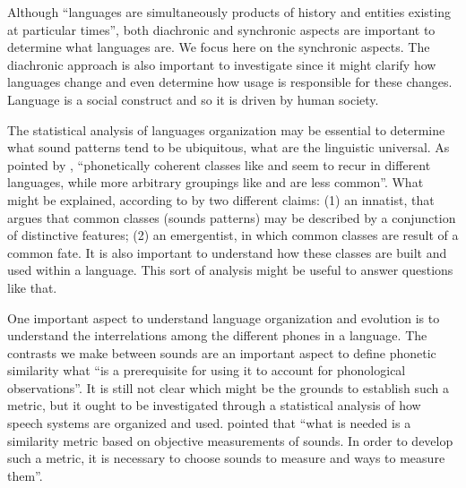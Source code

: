 
Although ``languages are simultaneously products of history and entities existing at particular times''\citep{good2008},
both diachronic and synchronic aspects are important to determine what languages are. We focus here on the
synchronic aspects. %
The diachronic approach is also important to investigate since it might clarify 
how languages change and even determine how usage is responsible for these changes. 
Language is a social construct and so it is driven by human society.

The statistical analysis of languages organization may be essential to determine what sound patterns tend to be 
ubiquitous, what are the linguistic universal.
As pointed by \cite{mielke2005}, ``phonetically coherent classes like  and  
seem to recur in different languages, while more arbitrary groupings like  and 
 are less common''. What might be explained, according to \cite{mielke2005} 
by two different claims: (1) an innatist, that argues that common classes (sounds patterns) may be described 
by a conjunction of distinctive features; (2) an emergentist, in which common classes are result of a 
common fate. It is also important to understand how these classes are built and used within a language. 
This sort of analysis might be useful to answer questions like that.

One important aspect to understand language organization and evolution is to understand the 
interrelations among the different phones in a language.
The contrasts we make between sounds are an important aspect to define phonetic similarity what 
``is a prerequisite for using it to account for phonological observations''\citep{mielke2005}. 
It is still not clear which might be the grounds to establish such a metric, but it ought to be investigated 
through a statistical analysis of how speech systems are organized and used. 
\cite{mielke2005} pointed that ``what is needed is a similarity metric based on objective measurements of sounds. 
In order to develop such a metric, it is necessary to choose sounds to measure and ways to measure them''.

